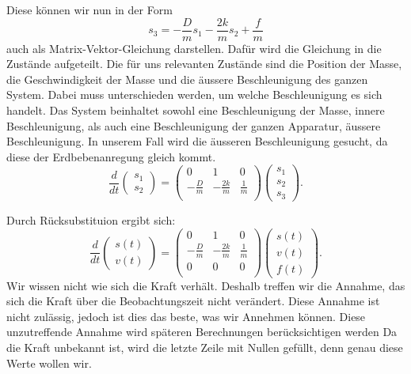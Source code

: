 Diese können wir nun in der Form
\[ {s_3}=-\frac{D}{m} {s_1} -\frac{2k}{m} {s_2} + \frac{f} {m} \]
auch als Matrix-Vektor-Gleichung darstellen.
Dafür wird die Gleichung in die Zustände aufgeteilt. 
Die für uns relevanten Zustände sind die Position der Masse, die Geschwindigkeit der Masse und die äussere Beschleunigung des ganzen System. 
Dabei muss unterschieden werden, um welche Beschleunigung es sich handelt. 
Das System beinhaltet sowohl eine Beschleunigung der Masse, innere Beschleunigung, als auch eine Beschleunigung der ganzen Apparatur, äussere Beschleunigung. 
In unserem Fall wird die äusseren Beschleunigung gesucht, da diese der Erdbebenanregung gleich kommt. 
\begin{equation}
\frac{d}{dt} \left(\begin{array}{c} {s_1} \\ {s_2}  \end{array}\right) = \left(
 \begin{array}{ccc} 	
0 & 1& 0 \\ 
- \frac{D}{m} &-\frac{2k}{m} & \frac{1} {m}\\
\end{array}\right)  \left(\begin{array}{c} {s_1} \\ {s_2} \\ {s_3} \end{array}\right).
\end{equation}

Durch Rücksubstituion ergibt sich:
\begin{equation}
\frac{d}{dt} \left(\begin{array}{c} s(t) \\ v(t) \end{array}\right) = \left(
 \begin{array}{ccc} 	
0 & 1& 0 \\ 
- \frac{D}{m} &-\frac{2k}{m} & \frac{1} {m}\\
0 & 0 & 0\\
\end{array}\right)  \left(\begin{array}{c} s(t)\\ v(t)\\ f(t) \end{array}\right).
\end{equation}
Wir wissen nicht wie sich die Kraft verhält. 
Deshalb treffen wir die Annahme, das sich die Kraft über die Beobachtungszeit nicht verändert.
Diese Annahme ist nicht zulässig, jedoch ist dies das beste, was wir Annehmen können. 
Diese unzutreffende Annahme wird späteren Berechnungen berücksichtigen werden
Da die Kraft unbekannt ist, wird die letzte Zeile mit Nullen gefüllt, denn genau diese Werte wollen wir. 











